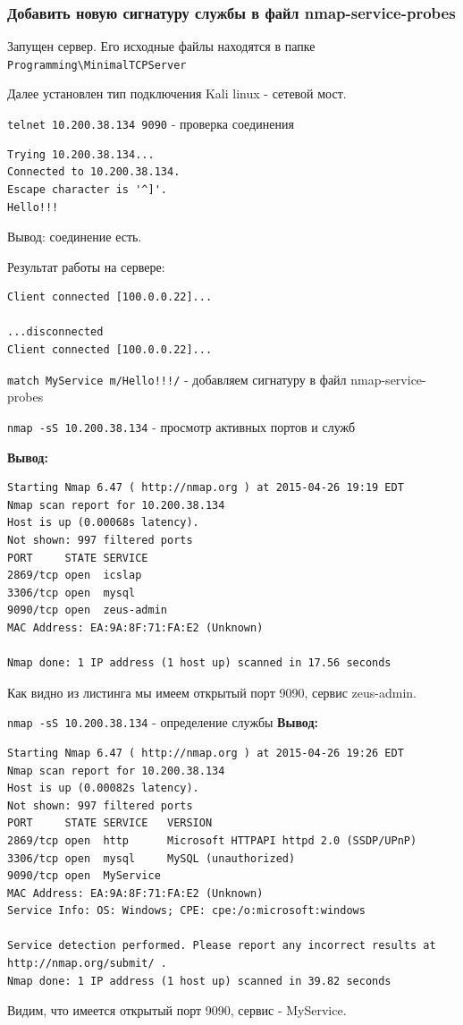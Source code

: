 \documentclass[12pt,a4paper]{article}
\begin{document}
\subsubsection{Добавить новую сигнатуру службы в файл nmap-service-probes}
Запущен сервер. Его исходные файлы находятся в папке \verb+Programming\MinimalTCPServer+


Далее установлен тип подключения Kali linux  - сетевой мост. 


\verb+telnet 10.200.38.134 9090+  - проверка соединения
\begin{lstlisting}
Trying 10.200.38.134...
Connected to 10.200.38.134.
Escape character is '^]'.
Hello!!!
\end{lstlisting}
Вывод: соединение есть.

Результат работы на сервере:
\begin{lstlisting}
Client connected [100.0.0.22]...

...disconnected
Client connected [100.0.0.22]...
\end{lstlisting}
\verb+match MyService m/Hello!!!/+ - добавляем сигнатуру в файл nmap-service-probes

\verb+nmap -sS 10.200.38.134+ - просмотр активных портов и служб

\textbf{Вывод:}
\begin{lstlisting}
Starting Nmap 6.47 ( http://nmap.org ) at 2015-04-26 19:19 EDT
Nmap scan report for 10.200.38.134
Host is up (0.00068s latency).
Not shown: 997 filtered ports
PORT     STATE SERVICE
2869/tcp open  icslap
3306/tcp open  mysql
9090/tcp open  zeus-admin
MAC Address: EA:9A:8F:71:FA:E2 (Unknown)

Nmap done: 1 IP address (1 host up) scanned in 17.56 seconds

\end{lstlisting}
Как видно из листинга мы имеем открытый порт 9090, сервис zeus-admin.

\verb+nmap -sS 10.200.38.134+ - определение службы
\textbf{Вывод:}
\begin{lstlisting}
Starting Nmap 6.47 ( http://nmap.org ) at 2015-04-26 19:26 EDT
Nmap scan report for 10.200.38.134
Host is up (0.00082s latency).
Not shown: 997 filtered ports
PORT     STATE SERVICE   VERSION
2869/tcp open  http      Microsoft HTTPAPI httpd 2.0 (SSDP/UPnP)
3306/tcp open  mysql     MySQL (unauthorized)
9090/tcp open  MyService
MAC Address: EA:9A:8F:71:FA:E2 (Unknown)
Service Info: OS: Windows; CPE: cpe:/o:microsoft:windows

Service detection performed. Please report any incorrect results at http://nmap.org/submit/ .
Nmap done: 1 IP address (1 host up) scanned in 39.82 seconds

\end{lstlisting}
Видим, что имеется открытый порт 9090, сервис - MyService.
\end{document}
